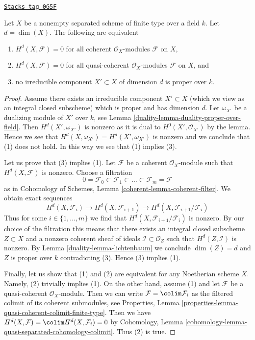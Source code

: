 \begin{theorem}[Lichtenbaum]
\label{duality-theorem-lichtenbaum}
\href{https://stacks.math.columbia.edu/tag/0G5F}{\texttt{Stacks tag 0G5F}}

Let $X$ be a nonempty separated scheme of finite type over a field $k$.
Let $d = \dim(X)$. The following are equivalent
\begin{enumerate}
\item $H^d(X, \mathcal{F}) = 0$ for all coherent $\mathcal{O}_X$-modules
$\mathcal{F}$ on $X$,
\item $H^d(X, \mathcal{F}) = 0$ for all quasi-coherent $\mathcal{O}_X$-modules
$\mathcal{F}$ on $X$, and
\item no irreducible component $X' \subset X$ of dimension $d$
is proper over $k$.
\end{enumerate}
\end{theorem}

\begin{proof}

Assume there exists an irreducible component $X' \subset X$ (which we view
as an integral closed subscheme) which is proper and has dimension $d$.
Let $\omega_{X'}$ be a dualizing module of $X'$ over $k$, see
Lemma \ref{duality-lemma-duality-proper-over-field}. Then
$H^d(X', \omega_{X'})$ is nonzero as it is dual to $H^0(X', \mathcal{O}_{X'})$
by the lemma. Hence we see that $H^d(X, \omega_{X'}) = H^d(X', \omega_{X'})$
is nonzero and we conclude that (1) does not hold.
In this way we see that (1) implies (3).

\medskip\noindent
Let us prove that (3) implies (1).
Let $\mathcal{F}$ be a coherent $\mathcal{O}_X$-module such that
$H^d(X, \mathcal{F})$ is nonzero. Choose a filtration
$$
0 = \mathcal{F}_0 \subset \mathcal{F}_1 \subset
\ldots \subset \mathcal{F}_m = \mathcal{F}
$$
as in Cohomology of Schemes, Lemma \ref{coherent-lemma-coherent-filter}.
We obtain exact sequences
$$
H^d(X, \mathcal{F}_i) \to H^d(X, \mathcal{F}_{i + 1}) \to
H^d(X, \mathcal{F}_{i + 1}/\mathcal{F}_i)
$$
Thus for some $i \in \{1, \ldots, m\}$ we find that
$H^d(X, \mathcal{F}_{i + 1}/\mathcal{F}_i)$ is nonzero.
By our choice of the filtration this means that there exists
an integral closed subscheme $Z \subset X$
and a nonzero coherent sheaf of ideals $\mathcal{I} \subset \mathcal{O}_Z$
such that $H^d(Z, \mathcal{I})$ is nonzero.
By Lemma \ref{duality-lemma-lichtenbaum}
we conclude $\dim(Z) = d$ and $Z$ is proper over $k$
contradicting (3). Hence (3) implies (1).

\medskip\noindent
Finally, let us show that (1) and (2) are equivalent for any Noetherian scheme
$X$. Namely, (2) trivially implies (1). On the other hand, assume (1) and
let $\mathcal{F}$ be a quasi-coherent $\mathcal{O}_X$-module. Then we can write
$\mathcal{F} = \colim \mathcal{F}_i$ as the filtered colimit of its coherent
submodules, see
Properties, Lemma \ref{properties-lemma-quasi-coherent-colimit-finite-type}.
Then we have $H^d(X, \mathcal{F}) = \colim H^d(X, \mathcal{F}_i) = 0$
by Cohomology, Lemma \ref{cohomology-lemma-quasi-separated-cohomology-colimit}.
Thus (2) is true.
\end{proof}



